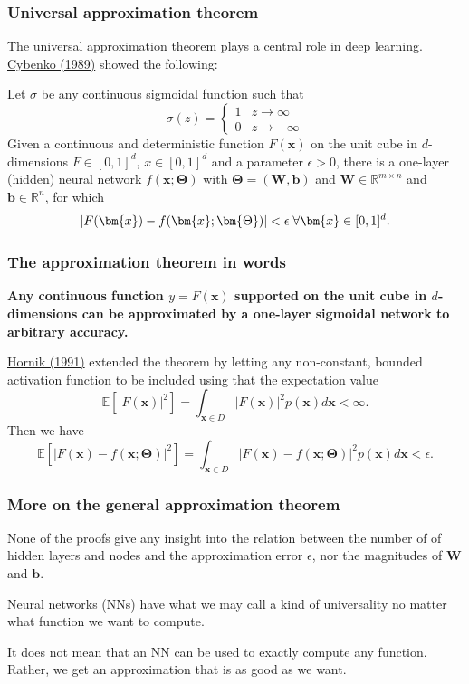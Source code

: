 \documentclass{beamer}
\begin{document}
\begin{frame}
\frametitle{Universal approximation theorem}

The universal approximation theorem plays a central role in deep
learning.  \href{{https://link.springer.com/article/10.1007/BF02551274}}{Cybenko (1989)} showed
the following:

\begin{block}{}
Let $\sigma$ be any continuous sigmoidal function such that
\[
\sigma(z) = \left\{\begin{array}{cc} 1 & z\rightarrow \infty\\ 0 & z \rightarrow -\infty \end{array}\right.
\]
Given a continuous and deterministic function $F(\bm{x})$ on the unit
cube in $d$-dimensions $F\in [0,1]^d$, $x\in [0,1]^d$ and a parameter
$\epsilon >0$, there is a one-layer (hidden) neural network
$f(\bm{x};\bm{\Theta})$ with $\bm{\Theta}=(\bm{W},\bm{b})$ and $\bm{W}\in
\mathbb{R}^{m\times n}$ and $\bm{b}\in \mathbb{R}^{n}$, for which
\[
\vert F(\bm{x})-f(\bm{x};\bm{\Theta})\vert < \epsilon \hspace{0.1cm} \forall \bm{x}\in[0,1]^d.
\]

\end{block}
\end{frame}

\begin{frame}
\frametitle{The approximation theorem in words}

\textbf{Any continuous function $y=F(\bm{x})$ supported on the unit cube in
$d$-dimensions can be approximated by a one-layer sigmoidal network to
arbitrary accuracy.}

\href{{https://www.sciencedirect.com/science/article/abs/pii/089360809190009T}}{Hornik (1991)} extended the theorem by letting any non-constant, bounded activation function to be included using that the expectation value
\[
\mathbb{E}[\vert F(\bm{x})\vert^2] =\int_{\bm{x}\in D} \vert F(\bm{x})\vert^2p(\bm{x})d\bm{x} < \infty.
\]
Then we have
\[
\mathbb{E}[\vert F(\bm{x})-f(\bm{x};\bm{\Theta})\vert^2] =\int_{\bm{x}\in D} \vert F(\bm{x})-f(\bm{x};\bm{\Theta})\vert^2p(\bm{x})d\bm{x} < \epsilon.
\]
\end{frame}

\begin{frame}
\frametitle{More on the general approximation theorem}

None of the proofs give any insight into the relation between the
number of of hidden layers and nodes and the approximation error
$\epsilon$, nor the magnitudes of $\bm{W}$ and $\bm{b}$.

Neural networks (NNs) have what we may call a kind of universality no matter what function we want to compute.

\begin{block}{}
It does not mean that an NN can be used to exactly compute any function. Rather, we get an approximation that is as good as we want. 
\end{block}
\end{frame}
\end{document}
